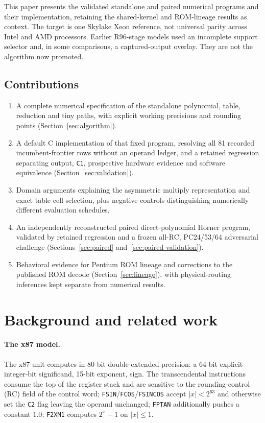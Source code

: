 \documentclass[11pt]{article}
\newcommand{\instr}[1]{\texttt{#1}}
\begin{document}
This paper presents the validated standalone and paired numerical programs and their
implementation, retaining the shared-kernel and ROM-lineage results as
context. The target is one Skylake Xeon reference, not universal parity across
Intel and AMD processors. Earlier R96-stage models used an incomplete support
selector and, in some comparisons, a captured-output overlay. They are not
the algorithm now promoted.

\subsection*{Contributions}

\begin{enumerate}
\item A complete numerical specification of the standalone polynomial,
table, reduction and tiny paths, with explicit working precisions and
rounding points (Section~\ref{sec:algorithm}).
\item A default C implementation of that fixed program, resolving all
81 recorded incumbent-frontier rows without an operand ledger, and a
retained regression separating output, \texttt{C1}, prospective hardware
evidence and software equivalence (Section~\ref{sec:validation}).
\item Domain arguments explaining the asymmetric multiply representation
and exact table-cell selection, plus negative controls distinguishing
numerically different evaluation schedules.
\item An independently reconstructed paired direct-polynomial Horner program, validated by
retained regression and a frozen all-RC, PC24/53/64 adversarial challenge
(Sections~\ref{sec:paired} and~\ref{sec:paired-validation}).
\item Behavioral evidence for Pentium ROM lineage and corrections to the
published ROM decode (Section~\ref{sec:lineage}), with physical-routing
inferences kept separate from numerical results.
\end{enumerate}

\section{Background and related work}
\label{sec:background}

\paragraph{The x87 model.}  The x87 unit computes in 80-bit double
extended precision: a 64-bit explicit-integer-bit significand, 15-bit
exponent, sign.  The transcendental instructions consume the top of
the register stack and are sensitive to the rounding-control (RC)
field of the control word; \instr{FSIN}/\instr{FCOS}/\instr{FSINCOS}
accept $|x| < 2^{63}$ and otherwise set the \texttt{C2} flag leaving
the operand unchanged; \instr{FPTAN} additionally pushes a constant
$1.0$; \instr{F2XM1} computes $2^x-1$ on $|x| \le 1$.
\end{document}
